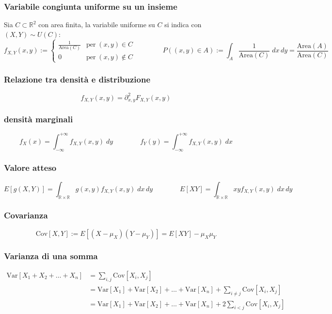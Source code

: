 \documentclass[a4paper]{article}
\newcommand\R{\mathbb{R}}     %
\newcommand\Rd{\mathbb{R}^2}  %
\newcommand\var{\text{Var}}   %
\newcommand\cov{\text{Cov}}   %
\begin{document}
\subsubsection*{Variabile congiunta uniforme su un insieme}
Sia \(C \subset \Rd\) con area finita, la variabile uniforme su \(C\) si indica con \((X,Y) \sim U(C)\):
\[f_{X,Y}(x,y) := \begin{cases}
	\displaystyle \frac{1}{\text{Area}(C)} &\text{per} \; (x,y) \in C \\
	0 &\text{per} \; (x,y) \notin C
\end{cases} \qquad \qquad P((x,y) \in A) := \int_A \frac{1}{\text{Area}(C)} \; dx \, dy = \frac{\text{Area}(A)}{\text{Area}(C)}\]

\subsubsection*{Relazione tra densità e distribuzione}
\[f_{X,Y}(x,y) = \partial_{x,y}^2 F_{X,Y}(x,y)\]

\subsubsection*{densità marginali}
\[f_X(x) = \int_{-\infty}^{+\infty} f_{X,Y}(x,y) \; dy \qquad \qquad f_Y(y) = \int_{-\infty}^{+\infty} f_{X,Y}(x,y) \; dx\]

\subsubsection*{Valore atteso}
\[E[g(X,Y)] = \int_{\R \times \R} g(x,y) f_{X,Y}(x,y) \; dx \, dy \qquad \qquad E[XY] = \int_{\R \times \R} xy f_{X,Y}(x,y) \; dx \, dy \]

\subsubsection*{Covarianza}
\[\cov[X,Y] := E[(X-\mu_X)(Y-\mu_Y)] = E[XY] - \mu_X \mu_Y\]

\subsubsection*{Varianza di una somma}
\begin{align*}
	\var[X_1 + X_2 + \dots + X_n] &= \sum_{i,j} \cov[X_i,X_j] \\
	&= \var[X_1] + \var[X_2] + \dots + \var[X_n] + \sum_{i \neq j} \cov[X_i,X_j] \\
	&= \var[X_1] + \var[X_2] + \dots + \var[X_n] + 2\sum_{i < j} \cov[X_i,X_j]
\end{align*}
\end{document}
